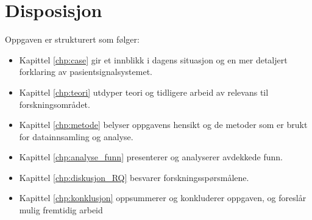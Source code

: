 \section{Disposisjon}
Oppgaven er strukturert som følger:
\begin{itemize}
\item Kapittel \ref{chp:case} gir et innblikk i dagens situasjon og en mer detaljert forklaring av pasientsignalsystemet.
\item Kapittel \ref{chp:teori} utdyper teori og tidligere arbeid av relevans til forskningsområdet.
\item Kapittel \ref{chp:metode} belyser oppgavens hensikt og de metoder som er brukt for datainnsamling og analyse.
\item Kapittel \ref{chp:analyse_funn} presenterer og analyserer avdekkede funn.
\item Kapittel \ref{chp:diskusjon_RQ} besvarer forskningsspørsmålene.
\item Kapittel \ref{chp:konklusjon} oppsummerer og konkluderer oppgaven, og foreslår mulig fremtidig arbeid
\end{itemize}


